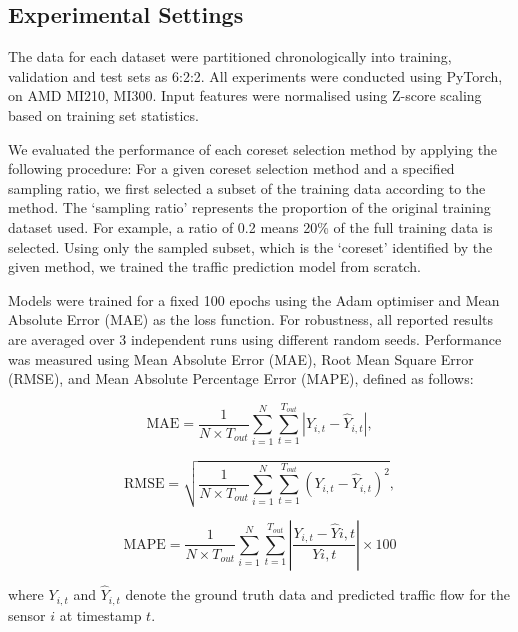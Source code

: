 \subsection{Experimental Settings}
The data for each dataset were partitioned chronologically into training, validation and test sets as 6:2:2. All experiments were conducted using PyTorch, on AMD MI210, MI300. Input features were normalised using Z-score scaling based on training set statistics.

We evaluated the performance of each coreset selection method by applying the following procedure: For a given coreset selection method and a specified sampling ratio, we first selected a subset of the training data according to the method. The `sampling ratio' represents the proportion of the original training dataset used. For example, a ratio of 0.2 means 20\% of the full training data is selected. Using only the sampled subset, which is the `coreset' identified by the given method, we trained the traffic prediction model from scratch.

Models were trained for a fixed 100 epochs using the Adam optimiser and Mean Absolute Error (MAE) as the loss function. For robustness, all reported results are averaged over 3 independent runs using different random seeds. Performance was measured using Mean Absolute Error (MAE), Root Mean Square Error (RMSE), and Mean Absolute Percentage Error (MAPE), defined as follows:

\begin{equation}
\text{MAE} = \frac{1}{N \times T_{out}} \sum_{i=1}^{N} \sum_{t=1}^{T_{out}} |Y_{i,t} - \hat{Y}_{i,t}|,
\end{equation}

\begin{equation}
\text{RMSE} = \sqrt{\frac{1}{N \times T_{out}} \sum_{i=1}^{N} \sum_{t=1}^{T_{out}} (Y_{i,t} - \hat{Y}_{i,t})^2},
\end{equation}

\begin{equation}
\text{MAPE} = \frac{1}{N \times T_{out}} \sum_{i=1}^{N} \sum_{t=1}^{T_{out}} \left|\frac{Y_{i,t} - \hat{Y}{i,t}}{Y{i,t}}\right| \times 100%
\end{equation}

where \( Y_{i,t} \) and \( \hat{Y}_{i,t} \) denote the ground truth data and predicted traffic flow for the sensor \( i \) at timestamp \( t \).
